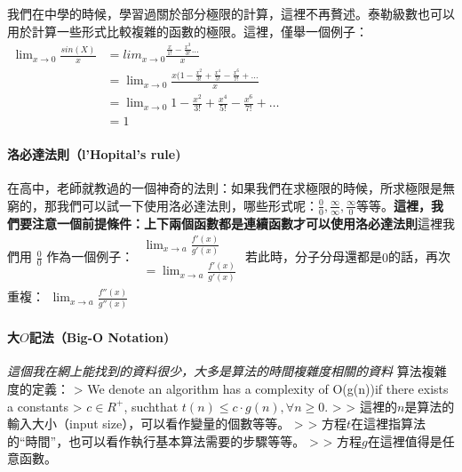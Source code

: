 \documentclass[11pt]{article}
\begin{document}
我們在中學的時候，學習過關於部分極限的計算，這裡不再贅述。泰勒級數也可以用於計算一些形式比較複雜的函數的極限。這裡，僅舉一個例子：
\(\begin{align*} \lim_{x\rightarrow 0}\frac{sin(X)}{x} &= lim_{x\rightarrow 0} \frac{\frac{x}{1!}-\frac{x^3}{3!}\dots }{x} \\ &= \lim_{x\rightarrow 0} \frac{x(1-\frac{x^2}{3!}+\frac{x^4}{5!}-\frac{x^6}{7!}+\dots}{x} \\ &= \lim_{x\rightarrow 0} 1 -\frac{x^2}{3!} + \frac{x^4}{5!}-\frac{x^6}{7!}+\dots \\& = 1 \end{align*}\)

\hypertarget{ux6d1bux5fc5ux9054ux6cd5ux5247lhopitals-rule}{%
\paragraph{洛必達法則（l'Hopital's
rule)}\label{ux6d1bux5fc5ux9054ux6cd5ux5247lhopitals-rule}}

在高中，老師就教過的一個神奇的法則：如果我們在求極限的時候，所求極限是無窮的，那我們可以試一下使用洛必達法則，哪些形式呢：\(\frac{0}{0}, \frac{\infty}{\infty}, \frac{\infty}{0}\)等等。\textbf{這裡，我們要注意一個前提條件：上下兩個函數都是連續函數才可以使用洛必達法則}這裡我們用
\(\frac{0}{0}\) 作為一個例子：
\(\begin{align*}\lim_{x \rightarrow a}\frac{f'(x)}{g'(x)} \\ = \lim_{x \rightarrow a}\frac{f'(x)}{g'(x)} \end{align*}\)
若此時，分子分母還都是\(0\)的話，再次重複：\(\begin{align*}\lim_{x \rightarrow a}\frac{f''(x)}{g''(x)}\end{align*}\)

    \hypertarget{ux5927oux8a18ux6cd5big-o-notation}{%
\paragraph{\texorpdfstring{大\(O\)記法（Big-O
Notation)}{大O記法（Big-O Notation)}}\label{ux5927oux8a18ux6cd5big-o-notation}}

\emph{這個我在網上能找到的資料很少，大多是算法的時間複雜度相關的資料}
算法複雜度的定義： \textgreater{} We denote an algorithm has a
complexity of O(g(n))if there exists a constants \textgreater{}
\(c \in R^+\), suchthat \(t(n)\leq c\cdot g(n), \forall n\geq 0\).
\textgreater{} \textgreater{} 這裡的\(n\)是算法的輸入大小（input
size），可以看作變量的個數等等。 \textgreater{} \textgreater{}
方程\(t\)在這裡指算法的``時間''，也可以看作執行基本算法需要的步驟等等。
\textgreater{} \textgreater{} 方程\(g\)在這裡值得是任意函數。
\end{document}
